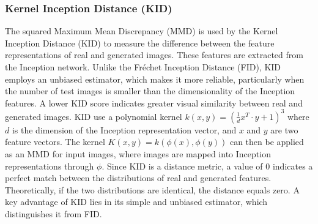 \documentclass[journal]{IEEEtran}
\begin{document}
\subsubsection{Kernel Inception Distance (KID)}
The squared Maximum Mean Discrepancy (MMD) is used by the Kernel Inception Distance (KID) to measure the difference between the feature representations of real and generated images. These features are extracted from the Inception network. Unlike the Fréchet Inception Distance (FID)\cite{heusel2017gans}, KID employs an unbiased estimator, which makes it more reliable, particularly when the number of test images is smaller than the dimensionality of the Inception features. A lower KID score indicates greater visual similarity between real and generated images\cite{kim2019ugatit}.
KID use a polynomial kernel $k(x,y)=(\frac{1}{d}x^T\cdot y+1)^3$ where $d$ is the dimension of the Inception representation vector, and $x$ and $y$ are two feature vectors. The kernel $K(x,y)=k(\phi(x),\phi(y))$ can then be applied as an MMD for input images, where images are mapped into Inception representations through $\phi$\cite{binkowski2018demystifying}.
Since KID is a distance metric, a value of 0 indicates a perfect match between the distributions of real and generated features. Theoretically, if the two distributions are identical, the distance equals zero. A key advantage of KID lies in its simple and unbiased estimator, which distinguishes it from FID\cite{binkowski2018demystifying}.
\end{document}
